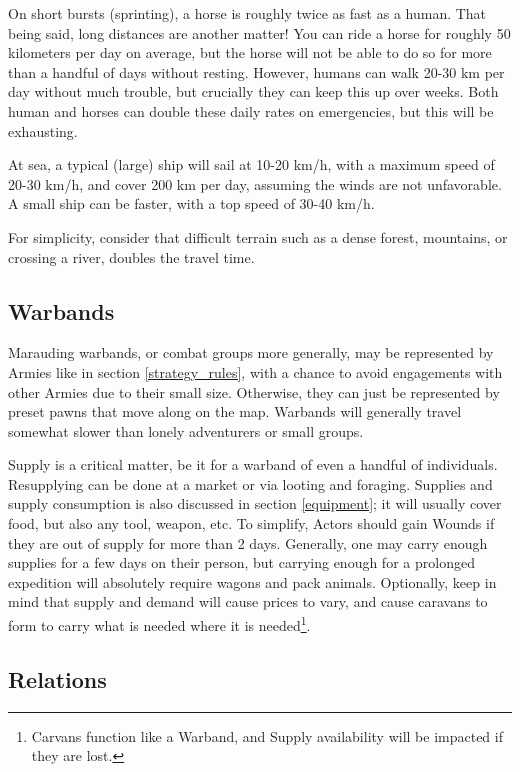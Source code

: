 On short bursts (sprinting), a horse is roughly twice as fast as a human. That being said, long distances are another matter! You can ride a horse for roughly 50 kilometers per day on average, but the horse will not be able to do so for more than a handful of days without resting. However, humans can walk 20-30 km per day without much trouble, but crucially they can keep this up over weeks. Both human and horses can double these daily rates on emergencies, but this will be exhausting.

At sea, a typical (large) ship will sail at 10-20 km/h, with a maximum speed of 20-30 km/h, and cover 200 km per day, assuming the winds are not unfavorable. A small ship can be faster, with a top speed of 30-40 km/h.

For simplicity, consider that difficult terrain such as a dense forest, mountains, or crossing a river, doubles the travel time.

\subsection{Warbands}

Marauding warbands, or combat groups more generally, may be represented by Armies like in section \ref{strategy_rules}, with a chance to avoid engagements with other Armies due to their small size. Otherwise, they can just be represented by preset pawns that move along on the map. Warbands will generally travel somewhat slower than lonely adventurers or small groups.

Supply is a critical matter, be it for a warband of even a handful of individuals. Resupplying can be done at a market or via looting and foraging. Supplies and supply consumption is also discussed in section \ref{equipment}; it will usually cover food, but also any tool, weapon, etc. To simplify, Actors should gain Wounds if they are out of supply for more than 2 days. Generally, one may carry enough supplies for a few days on their person, but carrying enough for a prolonged expedition will absolutely require wagons and pack animals. Optionally, keep in mind that supply and demand will cause prices to vary, and cause caravans to form to carry what is needed where it is needed\footnote{Carvans function like a Warband, and Supply availability will be impacted if they are lost.}.
	

\subsection{Relations}

